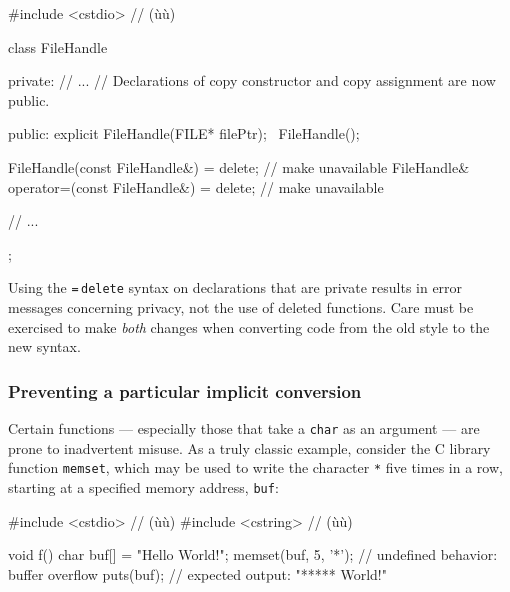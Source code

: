 %
%
%
\begin{emcppshiddenlisting}[emcppsbatch=e1]
#include <cstdio>  // (ù{}ù)
\end{emcppshiddenlisting}
\begin{emcppslisting}[emcppsbatch=e1]
class FileHandle
{
private:
    // ...
    // Declarations of copy constructor and copy assignment are now public.

public:
    explicit FileHandle(FILE* filePtr);
    ~FileHandle();

    FileHandle(const FileHandle&) = delete;             // make unavailable
    FileHandle& operator=(const FileHandle&) = delete;  // make unavailable

    // ...
};
\end{emcppslisting}

\noindent Using the \lstinline!=!\,\lstinline!delete! syntax on declarations that are private results in error messages concerning privacy, not the use of deleted functions. Care must be exercised to make \emph{both} changes when converting code from the old style to the new syntax.

\subsubsection[Preventing a particular implicit conversion]{Preventing a particular implicit conversion}\label{preventing-a-particular-implicit-conversion}

Certain functions --- especially those that take a \lstinline!char! as an
argument --- are prone to inadvertent misuse. As a truly classic
example, consider the C library function \lstinline!memset!, which may be used
to write the character \lstinline!*! five times in a row, starting at a
specified memory address, \lstinline!buf!:

%
\begin{emcppslisting}
#include <cstdio>  // (ù{}ù)
#include <cstring> // (ù{}ù)

void f()
{
    char buf[] = "Hello World!";
    memset(buf, 5, '*');  // undefined behavior: buffer overflow
    puts(buf);            // expected output: "***** World!"
}
\end{emcppslisting}


